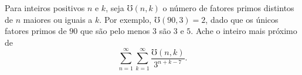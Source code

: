 Para inteiros positivos $n$ e $k$, seja $\mho(n, k)$ o número de fatores primos distintos de $n$ maiores ou iguais a $k$.
Por exemplo, $\mho(90, 3) = 2$, dado que os únicos fatores primos de $90$ que são pelo menos $3$ são $3$ e $5$.
Ache o inteiro mais próximo de \[\sum_{n=1}^\infty \sum_{k=1}^\infty \frac{\mho(n, k)}{3^{n+k-7}}.\]
